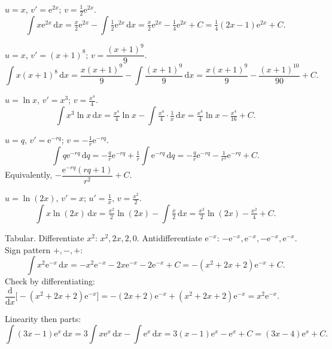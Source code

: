 \begin{solutions}
  \item $u=x$, $v'=\mathrm{e}^{2x}$; $v=\tfrac12\mathrm{e}^{2x}$.
        \[
          \int x\mathrm{e}^{2x}\,\mathrm{d}x
            = \tfrac{x}{2}\mathrm{e}^{2x}-\int \tfrac12\mathrm{e}^{2x}\,\mathrm{d}x
            = \tfrac{x}{2}\mathrm{e}^{2x}-\tfrac14\mathrm{e}^{2x}+C
            = \tfrac14(2x-1)\mathrm{e}^{2x}+C .
        \]

  \item $u=x$, $v'=(x+1)^{8}$; $v=\dfrac{(x+1)^{9}}{9}$.
        \[
          \int x(x+1)^{8}\,\mathrm{d}x
            = \frac{x(x+1)^{9}}{9}-\int \frac{(x+1)^{9}}{9}\,\mathrm{d}x
            = \frac{x(x+1)^{9}}{9}-\frac{(x+1)^{10}}{90}+C .
        \]

  \item $u=\ln x$, $v'=x^{3}$; $v=\tfrac{x^{4}}{4}$.
        \[
          \int x^{3}\ln x\,\mathrm{d}x
            = \tfrac{x^{4}}{4}\ln x - \int \tfrac{x^{4}}{4}\cdot\tfrac1x\,\mathrm{d}x
            = \tfrac{x^{4}}{4}\ln x - \tfrac{x^{4}}{16}+C .
        \]

  \item $u=q$, $v'=\mathrm{e}^{-rq}$; $v=-\tfrac1r\mathrm{e}^{-rq}$.
        \[
          \int q\mathrm{e}^{-rq}\,\mathrm{d}q
            = -\tfrac{q}{r}\mathrm{e}^{-rq}+\tfrac1r\int \mathrm{e}^{-rq}\,\mathrm{d}q
            = -\tfrac{q}{r}\mathrm{e}^{-rq}-\tfrac{1}{r^{2}}\mathrm{e}^{-rq}+C .
        \]
        Equivalently, $-\dfrac{\mathrm{e}^{-rq}(rq+1)}{r^{2}}+C$.

  \item $u=\ln(2x)$, $v'=x$; $u'=\tfrac1x$, $v=\tfrac{x^{2}}{2}$.
        \[
          \int x\ln(2x)\,\mathrm{d}x
            = \tfrac{x^{2}}{2}\ln(2x)-\int \tfrac{x}{2}\,\mathrm{d}x
            = \tfrac{x^{2}}{2}\ln(2x)-\tfrac{x^{2}}{4}+C .
        \]

  \item Tabular. Differentiate $x^{2}$: $x^{2},2x,2,0$. Antidifferentiate
        $\mathrm{e}^{-x}$: $-\mathrm{e}^{-x},\mathrm{e}^{-x},-\mathrm{e}^{-x},\mathrm{e}^{-x}$.
        Sign pattern $+,-,+$:
        \[
          \int x^{2}\mathrm{e}^{-x}\,\mathrm{d}x
            = -x^{2}\mathrm{e}^{-x}-2x\mathrm{e}^{-x}-2\mathrm{e}^{-x}+C
            = -(x^{2}+2x+2)\mathrm{e}^{-x}+C .
        \]
        Check by differentiating:
        $\dfrac{\mathrm{d}}{\mathrm{d}x}\bigl[-(x^{2}+2x+2)\mathrm{e}^{-x}\bigr]
          = -(2x+2)\mathrm{e}^{-x}+(x^{2}+2x+2)\mathrm{e}^{-x}=x^{2}\mathrm{e}^{-x}$.
        \checkmark

  \item Linearity then parts:
        \[
          \int (3x-1)\mathrm{e}^{x}\,\mathrm{d}x
            = 3\int x\mathrm{e}^{x}\,\mathrm{d}x - \int \mathrm{e}^{x}\,\mathrm{d}x
            = 3(x-1)\mathrm{e}^{x}-\mathrm{e}^{x}+C
            = (3x-4)\mathrm{e}^{x}+C .
        \]


\end{solutions}
